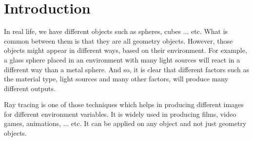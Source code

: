 \documentclass{article}
\begin{document}
	\section{Introduction}
	In real life, we have different objects such as spheres, cubes ... etc. What is common between them is that they are all geometry objects. However, those objects might appear in different ways, based on their environment. For example, a glass sphere placed in an environment with many light sources will react in a different way than a metal sphere. And so, it is clear that different factors such as the material type, light sources and many other factors, will produce many different outputs. \\
	\par Ray tracing is one of those techniques which helps in producing different images for different environment variables. It is widely used in producing films, video games, animations, ... etc. It can be applied on any object and not just geometry objects.
\end{document}
